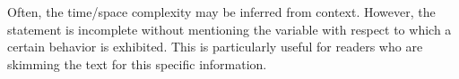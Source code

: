 


\noindent Often, the time/space complexity may be inferred from context.
However, the statement is incomplete without mentioning the variable with respect to which a certain behavior is exhibited.
This is particularly useful for readers who are skimming the text for this specific information.
